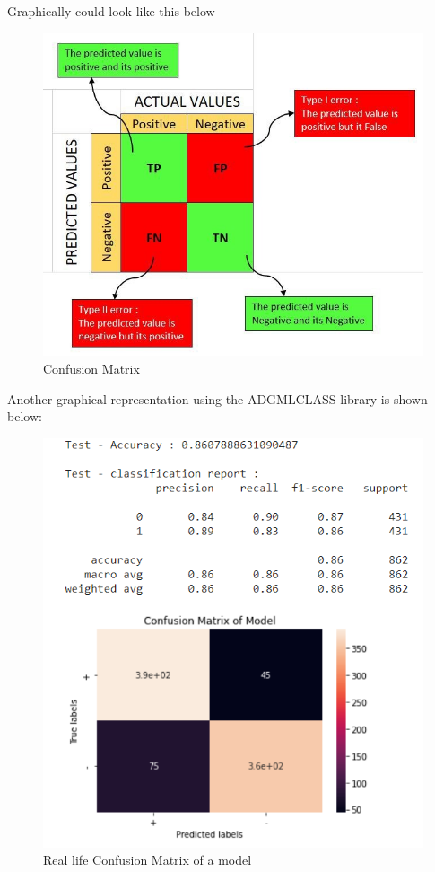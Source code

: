 Graphically could look like this below
\begin{figure}[H]
    \includegraphics[width=\linewidth]{images/confusionmatrix.jpg}
    \caption{Confusion Matrix}
    \label{fig:confusion}
\end{figure}

Another graphical representation using the ADGMLCLASS library is shown below:
\begin{figure}[H]
    \includegraphics[width=\linewidth]{images/confusionmatrixpt2.png}
    \caption{Real life Confusion Matrix of a model}
    \label{fig:confusion2}
\end{figure}


